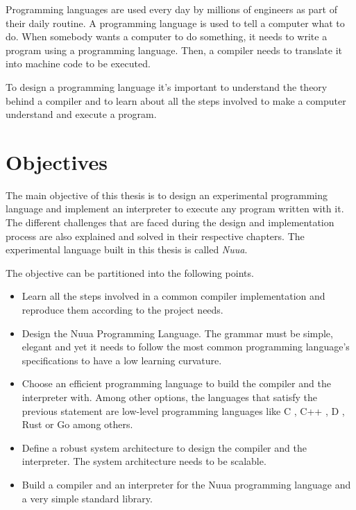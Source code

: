 Programming languages are used every day by millions of engineers as part of their daily routine.
A programming language is used to tell a computer what to do. When
somebody wants a computer to do something, it needs to write a program using a programming language. Then,
a compiler needs to translate it into machine code to be executed.

To design a programming language it's important to understand the theory behind a compiler and to learn about all the
steps involved to make a computer understand and execute a program.

\section{Objectives}

The main objective of this thesis is to design an experimental programming language and implement an interpreter to execute
any program written with it. The different challenges that are faced during the design and implementation process are also explained and
solved in their respective chapters. The experimental language built in this thesis is called \emph{Nuua}.

The objective can be partitioned into the following points.

\begin{itemize}
    \item Learn all the steps involved in a common compiler implementation and reproduce them according to the project needs.
    \item Design the Nuua Programming Language. The grammar must be simple, elegant and yet it needs to follow the most
        common programming language's specifications to have a low learning curvature.
    \item Choose an efficient programming language to build the compiler and the interpreter with. Among other options, the languages that
    satisfy the previous statement are low-level programming languages like C \autocite{c_programming_language}, C++ \autocite{cpp_programming_language},
    D \autocite{d_programming_language}, Rust \autocite{rust_programming_language} or Go \autocite{go_programming_language} among others.
    \item Define a robust system architecture to design the compiler and the interpreter. The system architecture needs to be scalable.
    \item Build a compiler and an interpreter for the Nuua programming language and a very simple standard library.
\end{itemize}

